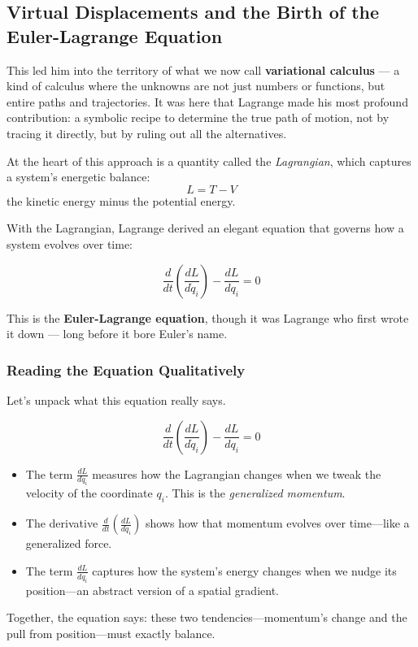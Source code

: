 \subsection{Virtual Displacements and the Birth of the Euler-Lagrange Equation}

This led him into the territory of what we now call \textbf{variational calculus} — a kind of calculus where the unknowns are not just numbers or functions, but entire paths and trajectories. It was here that Lagrange made his most profound contribution: a symbolic recipe to determine the true path of motion, not by tracing it directly, but by ruling out all the alternatives.

At the heart of this approach is a quantity called the \textit{Lagrangian}, which captures a system’s energetic balance:
\[
L = T - V
\]
the kinetic energy minus the potential energy.

With the Lagrangian, Lagrange derived an elegant equation that governs how a system evolves over time:

\[
\frac{d}{dt} \left( \frac{dL}{d\dot{q}_i} \right) - \frac{dL}{dq_i} = 0
\]

This is the \textbf{Euler-Lagrange equation}, though it was Lagrange who first wrote it down — long before it bore Euler’s name.

\subsubsection{Reading the Equation Qualitatively}

Let’s unpack what this equation really says.

\[
\frac{d}{dt} \left( \frac{dL}{d\dot{q}_i} \right) - \frac{dL}{dq_i} = 0
\]

\begin{itemize}
    \item The term \( \frac{dL}{d\dot{q}_i} \) measures how the Lagrangian changes when we tweak the velocity of the coordinate \( q_i \). This is the \textit{generalized momentum}.
    \item The derivative \( \frac{d}{dt} \left( \frac{dL}{d\dot{q}_i} \right) \) shows how that momentum evolves over time—like a generalized force.
    \item The term \( \frac{dL}{dq_i} \) captures how the system’s energy changes when we nudge its position—an abstract version of a spatial gradient.
\end{itemize}

Together, the equation says: these two tendencies—momentum’s change and the pull from position—must exactly balance.

